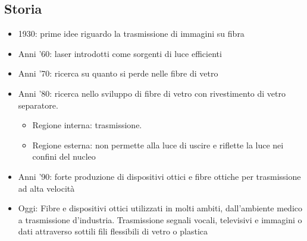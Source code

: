 \documentclass[8pt]{extarticle}
\begin{document}
\subsection{Storia}
\begin{itemize}
    \item 1930: prime idee riguardo la trasmissione di immagini su fibra
    \item Anni ’60: laser introdotti come sorgenti di luce efficienti
    \item Anni ’70: ricerca su quanto si perde nelle fibre di vetro
    \item Anni ’80: ricerca nello sviluppo di fibre di vetro con rivestimento di vetro separatore.
    \begin{itemize}
    \item Regione interna: trasmissione. 
    \item Regione esterna: non permette alla luce di uscire e riflette la luce nei confini del nucleo
    \end{itemize}
    \item Anni ’90: forte produzione di dispositivi ottici e fibre ottiche per trasmissione ad alta velocità
    \item Oggi: Fibre e dispositivi ottici utilizzati in molti ambiti, dall’ambiente medico a trasmissione d’industria. Trasmissione segnali vocali, televisivi e immagini o dati attraverso sottili fili flessibili di vetro o plastica
\end{itemize}
\end{document}
